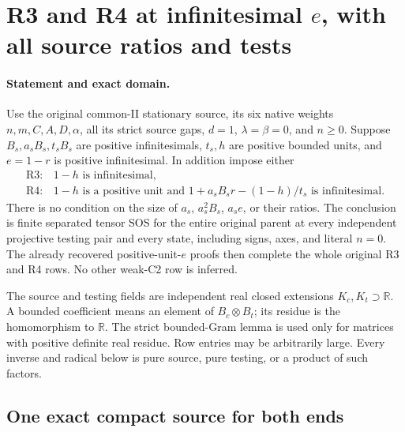 \section{R3 and R4 at infinitesimal \(e\), with all source ratios and tests}
\label{sec:new-r34-all-tests}

\paragraph{Statement and exact domain.}
Use the original common-II stationary source, its six native weights
$n,m,C,A,D,\alpha$, all its strict source gaps, $d=1$,
$\lambda=\beta=0$, and $n\geq0$. Suppose $B_s,a_sB_s,t_sB_s$
are positive infinitesimals, $t_s,h$ are positive bounded units,
and $e=1-r$ is positive infinitesimal. In addition impose either
\[
 \begin{array}{ll}
 \mathrm{R3}:&1-h\text{ is infinitesimal},\\
 \mathrm{R4}:&1-h\text{ is a positive unit and }
       1+a_sB_sr-(1-h)/t_s\text{ is infinitesimal}.
 \end{array}                                                    \tag{EN1}
\]
There is no condition on the size of $a_s$, $a_s^2B_s$,
$a_s e$, or their ratios. The conclusion is finite separated tensor
SOS for the entire original parent at every independent projective
testing pair and every state, including signs, axes, and literal $n=0$.
The already recovered positive-unit-$e$ proofs then complete the
whole original R3 and R4 rows. No other weak-C2 row is inferred.

The source and testing fields are independent real closed extensions
$K_c,K_t\supset\mathbb R$. A bounded coefficient means an element
of $B_c\otimes B_t$; its residue is the homomorphism to $\mathbb R$.
The strict bounded-Gram lemma is used only for matrices with positive
definite real residue. Row entries may be arbitrarily large.
Every inverse and radical below is pure source, pure testing, or a
product of such factors.

\subsection{One exact compact source for both ends}

